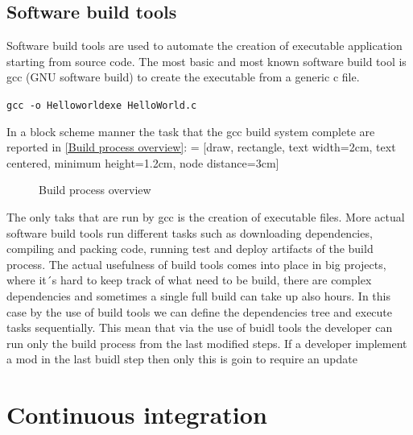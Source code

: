 \documentclass[../main.tex]{subfiles}
\begin{document}
\subsection{Software build tools}
Software build tools are used to automate the creation of executable application starting from source code. The most basic and most known software build tool is gcc (GNU software build) to create the executable from a generic c file. 
\begin{center}
    \texttt{gcc -o Helloworldexe HelloWorld.c}
\end{center}
In a block scheme manner the task that the gcc build system complete are reported in \ref{Build process overview}:
 = [draw, rectangle, text width=2cm, text centered, minimum height=1.2cm, node distance=3cm]
\begin{figure}[h]
  \centering
{}
  \caption{Build process overview}
\end{figure}
The only taks that are run by gcc is the creation of executable files. More actual software build tools run different tasks such as downloading dependencies, compiling and packing code, running test and deploy artifacts of the build process. The actual usefulness of build tools comes into place in big projects, where it´s hard to keep track of what need to be build, there are complex dependencies and sometimes a single full build can take up also hours. In this case by the use of build tools we can define the dependencies tree and execute tasks sequentially. This mean that via the use of buidl tools the developer can run only the build process from the last modified steps. If a developer implement a mod in the last buidl step then only this is goin to require an update 
\section{Continuous integration}
\cleardoublepage
\end{document}
